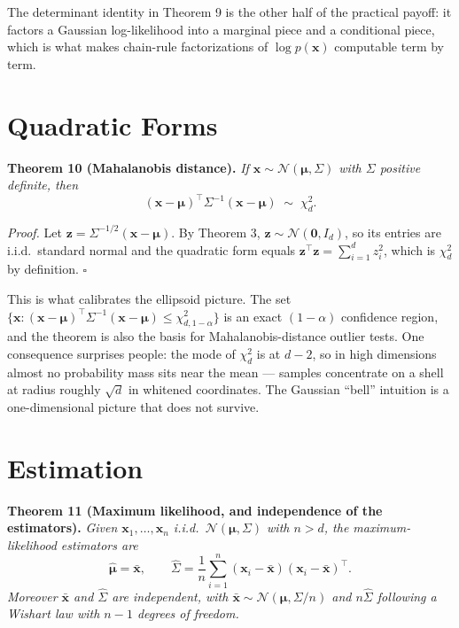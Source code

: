 \documentclass[conference]{IEEEtran}
\begin{document}
\medskip
The determinant identity in Theorem 9 is the other half of the practical payoff: it factors a Gaussian log-likelihood into a marginal piece and a conditional piece, which is what makes chain-rule factorizations of $\log p(\mathbf{x})$ computable term by term.

\section*{Quadratic Forms}
\noindent\textbf{Theorem 10 (Mahalanobis distance).}
\textit{If $\mathbf{x} \sim \mathcal{N}(\boldsymbol{\mu},\Sigma)$ with $\Sigma$ positive definite, then}
\begin{equation}
    (\mathbf{x}-\boldsymbol{\mu})^{\!\top}\Sigma^{-1}(\mathbf{x}-\boldsymbol{\mu}) \;\sim\; \chi^2_d .
\end{equation}

\medskip
\textit{Proof.} Let $\mathbf{z} = \Sigma^{-1/2}(\mathbf{x}-\boldsymbol{\mu})$. By Theorem 3, $\mathbf{z} \sim \mathcal{N}(\mathbf{0}, I_d)$, so its entries are i.i.d.\ standard normal and the quadratic form equals $\mathbf{z}^{\!\top}\mathbf{z} = \sum_{i=1}^{d} z_i^2$, which is $\chi^2_d$ by definition. $\square$

\medskip
This is what calibrates the ellipsoid picture. The set $\{\mathbf{x} : (\mathbf{x}-\boldsymbol{\mu})^{\!\top}\Sigma^{-1}(\mathbf{x}-\boldsymbol{\mu}) \leq \chi^2_{d,1-\alpha}\}$ is an exact $(1-\alpha)$ confidence region, and the theorem is also the basis for Mahalanobis-distance outlier tests. One consequence surprises people: the mode of $\chi^2_d$ is at $d-2$, so in high dimensions almost no probability mass sits near the mean --- samples concentrate on a shell at radius roughly $\sqrt{d}$ in whitened coordinates. The Gaussian ``bell'' intuition is a one-dimensional picture that does not survive.

\section*{Estimation}
\noindent\textbf{Theorem 11 (Maximum likelihood, and independence of the estimators).}
\textit{Given $\mathbf{x}_1,\dots,\mathbf{x}_n$ i.i.d.\ $\mathcal{N}(\boldsymbol{\mu},\Sigma)$ with $n > d$, the maximum-likelihood estimators are}
\begin{equation}
    \hat{\boldsymbol{\mu}} = \bar{\mathbf{x}},
    \qquad
    \hat{\Sigma} = \frac{1}{n}\sum_{i=1}^{n}(\mathbf{x}_i-\bar{\mathbf{x}})(\mathbf{x}_i-\bar{\mathbf{x}})^{\!\top}.
\end{equation}
\textit{Moreover $\bar{\mathbf{x}}$ and $\hat{\Sigma}$ are independent, with $\bar{\mathbf{x}} \sim \mathcal{N}(\boldsymbol{\mu}, \Sigma/n)$ and $n\hat{\Sigma}$ following a Wishart law with $n-1$ degrees of freedom.}
\end{document}
